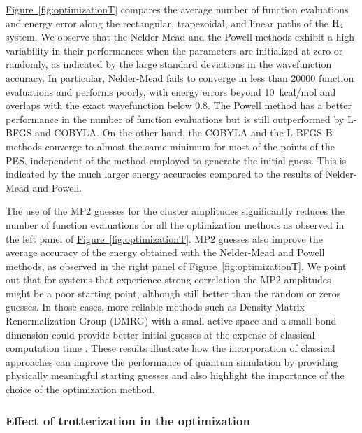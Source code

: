\documentclass[superscriptaddress,aps,pra,twocolumn,nofootinbib,babel]{revtex4-1}
\newcommand{\fig}[1]{\hyperref[fig:#1]{Figure~\ref*{fig:#1}}}
\begin{document}
\fig{optimizationT} compares the average number of function evaluations and energy error along the rectangular, trapezoidal, and linear paths of the $\rm{H}_4$ system. We observe that the Nelder-Mead and the Powell methods exhibit a high variability in their performances when the parameters are initialized at zero or randomly, as indicated by the large standard deviations in the wavefunction accuracy. In particular, Nelder-Mead fails to converge in less than 20000 function evaluations and performs poorly, with energy errors beyond 10~kcal/mol and overlaps with the exact wavefunction below 0.8. The Powell method has a better performance in the number of function evaluations but is still outperformed by L-BFGS and COBYLA. On the other hand, the COBYLA and the L-BFGS-B methods converge to almost the same minimum for most of the points of the PES, independent of the method employed to generate the initial guess. This is indicated by the much larger energy accuracies compared to the results of Nelder-Mead and Powell.

The use of the MP2 guesses for the cluster amplitudes significantly reduces the number of function evaluations for all the optimization methods as observed in the left panel of \fig{optimizationT}. MP2 guesses also improve the average accuracy of the energy obtained with the Nelder-Mead and Powell methods, as observed in the right panel of \fig{optimizationT}. We point out that for systems that experience strong correlation the MP2 amplitudes might be a poor starting point, although still better than the random or zeros guesses. In those cases, more reliable methods such as Density Matrix Renormalization Group (DMRG) with a small active space and a small bond dimension could provide better initial guesses at the expense of classical computation time \cite{veis.JPCL.7.4072.2016}. These results illustrate how the incorporation of classical approaches can improve the performance of quantum simulation by providing physically meaningful starting guesses and also highlight the importance of the choice of the optimization method. 

\subsubsection{Effect of trotterization in the optimization}
\end{document}

